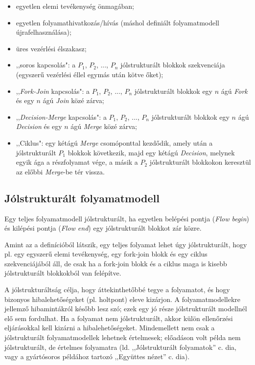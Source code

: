 \begin{itemize}
\item egyetlen elemi tevékenység önmagában;
\item egyetlen folyamathivatkozás/hívás (máshol definiált folyamatmodell újrafelhasználása);
\item üres vezérlési élszakasz;
\item ,,soros kapcsolás": a $P_1$, $P_2$, ..., $P_n$ jólstrukturált blokkok szekvenciája (egyszerű vezérlési éllel egymás után kötve őket);
\item ,,\emph{Fork-Join} kapcsolás": a $P_1$, $P_2$, ..., $P_n$ jólstrukturált blokkok egy $n$ ágú \emph{Fork} és egy $n$ ágú \emph{Join} közé zárva;
\item ,,\emph{Decision-Merge} kapcsolás": a $P_1$, $P_2$, ..., $P_n$ jólstrukturált blokkok egy $n$ ágú \emph{Decision} és egy $n$ ágú \emph{Merge} közé zárva;
\item ,,Ciklus": egy kétágú \emph{Merge} csomóponttal kezdődik, amely után a jólstrukturált $P_1$ blokkok következik, majd egy kétágú \emph{Decision}, melynek egyik ága a részfolyamat vége, a másik a $P_2$ jólstrukturált blokkokon keresztül az előbbi \emph{Merge}-be tér vissza.
\end{itemize}

\subsection{Jólstrukturált folyamatmodell}

Egy teljes folyamatmodell jólstrukturált, ha egyetlen belépési pontja (\emph{Flow begin}) és kilépési pontja (\emph{Flow end}) egy jólstrukturált blokkot zár közre.

Amint az a definícióból látszik, egy teljes folyamat lehet úgy jólstrukturált, hogy pl. egy egyszerű elemi tevékenység, egy fork-join blokk és egy ciklus szekvenciájából áll, de csak ha a fork-join blokk és a ciklus maga is kisebb jólstrukturált blokkokból van felépítve.

A jólstrukturáltság célja, hogy áttekinthetőbbé tegye a folyamatot, és hogy bizonyos hibalehetőségeket (pl. holtpont) eleve kizárjon. A folyamatmodellekre jellemző hibamintákról később lesz szó; ezek egy jó része jólstrukturált modellnél elő sem fordulhat. Ha a folyamat nem jólstrukturált, akkor külön ellenőrzési eljárásokkal kell kizárni a hibalehetőségeket. Mindemellett nem csak a jólstrukturált folyamatmodellek lehetnek értelmesek; előadáson volt példa nem jólstrukturált, de értelmes folyamatra (ld. ,,Jólstrukturált folyamatok'' c. dia, vagy a gyártósoros példához tartozó ,,Együttes nézet'' c. dia).

